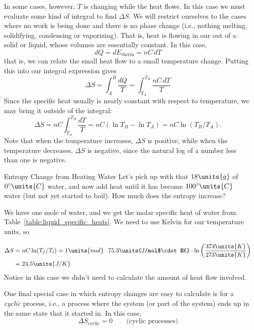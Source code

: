 In some cases, however, $T$ is changing while the heat flows.  In this
case we must evaluate some kind of integral to find $\Delta S$.  We
will restrict ourselves to the cases where no work is being done and
there is no phase change (i.e., nothing melting, solidifying,
condensing or vaporizing).  That is, heat is flowing in our out of a
solid or liquid, whose volumes are essentially constant.  In this
case,
\begin{equation}
dQ = dE_\text{therm} = nC\,dT
\end{equation}
that is, we can relate the small heat flow to a small temperature
change. Putting this into our integral expression gives
\begin{equation}
\Delta S = \int_A^B \frac{dQ}{T}= \int_{T_A}^{T_B} \frac{nC\,dT}{T} 
\end{equation}
Since the specific heat usually is nearly constant with respect to
temperature, we may bring it outside of the integral:
\begin{equation}
\Delta S = nC\int_{T_A}^{T_B} \frac{dT}{T} = nC(\ln T_B -\ln T_A)
 = nC\ln(T_B/T_A).
\end{equation}
Note that when the temperature increases, $\Delta S$ is positive,
while when the temperature decreases, $\Delta S$ is negative, since
the natural log of a number less than one is negative.

\begin{example}{Entropy Change from Heating Water}
  Let's pick up with that $18\units{g}$ of $0^\circ\units{C}$ water,
  and now add heat until it has become $100^\circ\units{C}$ water (but
  not yet started to boil).  How much does the entropy increase?

  \solution We have one mole of water, and we get the molar specific
  heat of water from Table~\ref{table:liquid_specific_heats}.  We need
  to use Kelvin for our temperature units, so

\begin{align}
  \Delta S &= nC\ln(T_f/T_i) = 1\units{mol}\cdot  75.3\units{J/mol$\cdot$K}
  \cdot\ln\left(\frac{373\units{K}}{273\units{K}}\right) \nonumber\\
 &= 23.5\units{J/K}
\end{align}
Notice in this case we didn't need to calculate the amount of heat
flow involved.
\end{example}

One final special case in which entropy changes are easy to calculate
is for a {\em cyclic} process, i.e., a process where the system (or
part of the system) ends up in the same state that it started in.  In
this case,
\begin{equation}
\Delta S_\text{cyclic} = 0
\qquad\text{(cyclic processes)}
\label{eq:DeltaS_cyclic}
\end{equation}

